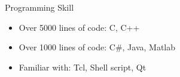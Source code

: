 \documentclass{resume}
\begin{document}
\begin{rSection}{Programming Skill}
\renewcommand\labelitemi{$\cdot$}
\begin{itemize}[leftmargin=0em]
  \item Over 5000 lines of code: C, C++
  \item Over 1000 lines of code: C\#, Java, Matlab
  \item Familiar with: Tcl, Shell script, Qt
\end{itemize}


\end{rSection}

\end{document}
